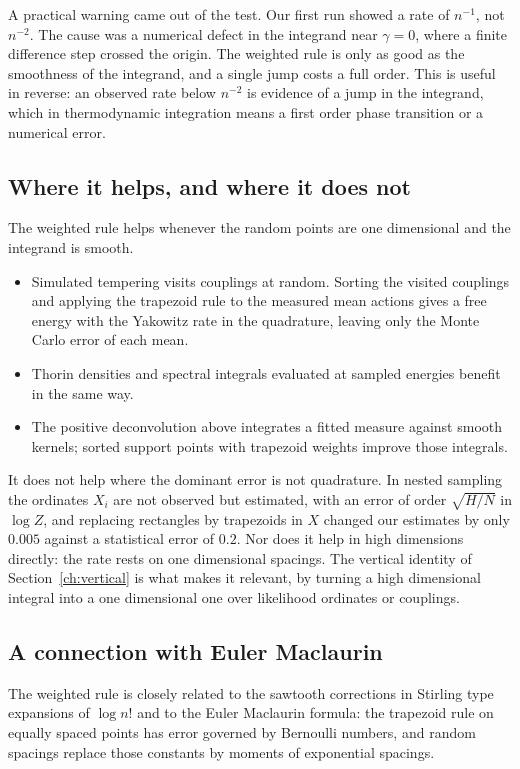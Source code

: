 A practical warning came out of the test. Our first run showed a rate of $n^{-1}$, not $n^{-2}$. The cause was a numerical defect in the integrand near $\gamma=0$, where a finite difference step crossed the origin. The weighted rule is only as good as the smoothness of the integrand, and a single jump costs a full order. This is useful in reverse: an observed rate below $n^{-2}$ is evidence of a jump in the integrand, which in thermodynamic integration means a first order phase transition or a numerical error.

\subsection{Where it helps, and where it does not}

The weighted rule helps whenever the random points are one dimensional and the integrand is smooth.
\begin{itemize}
\item Simulated tempering visits couplings at random. Sorting the visited couplings and applying the trapezoid rule to the measured mean actions gives a free energy with the Yakowitz rate in the quadrature, leaving only the Monte Carlo error of each mean.
\item Thorin densities and spectral integrals evaluated at sampled energies benefit in the same way.
\item The positive deconvolution above integrates a fitted measure against smooth kernels; sorted support points with trapezoid weights improve those integrals.
\end{itemize}
It does not help where the dominant error is not quadrature. In nested sampling the ordinates $X_i$ are not observed but estimated, with an error of order $\sqrt{H/N}$ in $\log Z$, and replacing rectangles by trapezoids in $X$ changed our estimates by only $0.005$ against a statistical error of $0.2$. Nor does it help in high dimensions directly: the rate rests on one dimensional spacings. The vertical identity of Section~\ref{ch:vertical} is what makes it relevant, by turning a high dimensional integral into a one dimensional one over likelihood ordinates or couplings.

\subsection{A connection with Euler Maclaurin}

The weighted rule is closely related to the sawtooth corrections in Stirling type expansions of $\log n!$ and to the Euler Maclaurin formula: the trapezoid rule on equally spaced points has error governed by Bernoulli numbers, and random spacings replace those constants by moments of exponential spacings.

